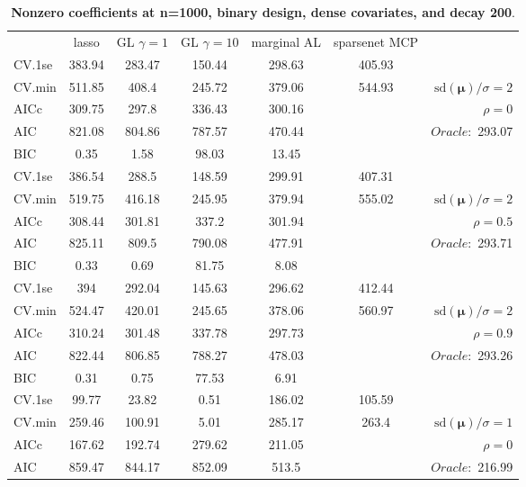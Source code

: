 \begin{table}\vspace{-.5cm}
\caption[l]{ { \bf Nonzero coefficients at n=1000, binary design, 
dense covariates, and  decay  200}.}
\vspace{-.5cm}
\footnotesize{}
\begin{center}
\begin{tabular}{l*{5}{c}|r}
& lasso & GL $\gamma=1$ & GL $\gamma=10$ & marginal AL & sparsenet MCP  & \\
 \cline{1-7}
CV.1se & 383.94 & 283.47 & 150.44 & 298.63 & 405.93 & \\
CV.min & 511.85 & 408.4 & 245.72 & 379.06 & 544.93 &  $\mathrm{sd}(\mathbf{\mu})/\sigma=2$ \\
AICc & 309.75 & 297.8 & 336.43 & 300.16 & & $\rho=0$ \\
AIC & 821.08 & 804.86 & 787.57 & 470.44 & &  \multirow{2}{*}{$Oracle: $ 293.07} \\
BIC & 0.35 & 1.58 & 98.03 & 13.45 & &  \\
 \hline 
CV.1se & 386.54 & 288.5 & 148.59 & 299.91 & 407.31 & \\
CV.min & 519.75 & 416.18 & 245.95 & 379.94 & 555.02 &  $\mathrm{sd}(\mathbf{\mu})/\sigma=2$ \\
AICc & 308.44 & 301.81 & 337.2 & 301.94 & & $\rho=0.5$ \\
AIC & 825.11 & 809.5 & 790.08 & 477.91 & &  \multirow{2}{*}{$Oracle: $ 293.71} \\
BIC & 0.33 & 0.69 & 81.75 & 8.08 & &  \\
 \hline 
CV.1se & 394 & 292.04 & 145.63 & 296.62 & 412.44 & \\
CV.min & 524.47 & 420.01 & 245.65 & 378.06 & 560.97 &  $\mathrm{sd}(\mathbf{\mu})/\sigma=2$ \\
AICc & 310.24 & 301.48 & 337.78 & 297.73 & & $\rho=0.9$ \\
AIC & 822.44 & 806.85 & 788.27 & 478.03 & &  \multirow{2}{*}{$Oracle: $ 293.26} \\
BIC & 0.31 & 0.75 & 77.53 & 6.91 & &  \\
 \hline 
CV.1se & 99.77 & 23.82 & 0.51 & 186.02 & 105.59 & \\
CV.min & 259.46 & 100.91 & 5.01 & 285.17 & 263.4 &  $\mathrm{sd}(\mathbf{\mu})/\sigma=1$ \\
AICc & 167.62 & 192.74 & 279.62 & 211.05 & & $\rho=0$ \\
AIC & 859.47 & 844.17 & 852.09 & 513.5 & &  \multirow{2}{*}{$Oracle: $ 216.99} \\

\end{tabular}
\end{center}
\end{table}
